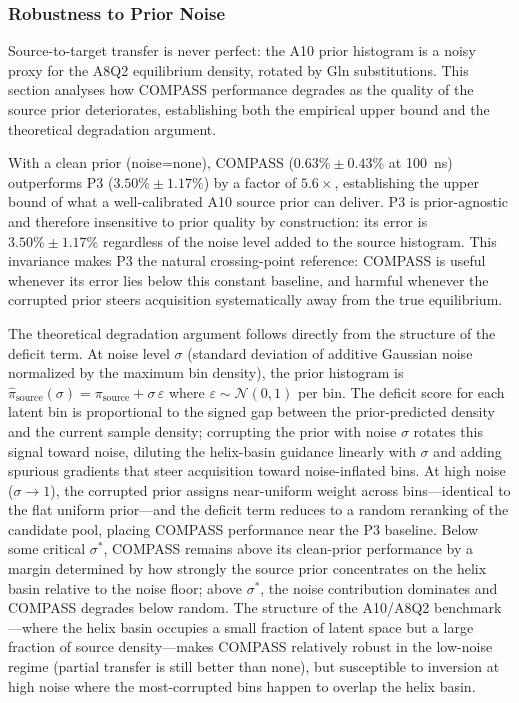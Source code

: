 \subsubsection{Robustness to Prior Noise}
\label{sec:prior_quality}

Source-to-target transfer is never perfect: the A10 prior histogram is a noisy proxy for the A8Q2 equilibrium density, rotated by Gln substitutions.
This section analyses how COMPASS performance degrades as the quality of the source prior deteriorates, establishing both the empirical upper bound and the theoretical degradation argument.

With a clean prior (noise=none), COMPASS ($0.63\%\pm0.43\%$ at 100~ns) outperforms P3 ($3.50\%\pm1.17\%$) by a factor of $5.6\times$, establishing the upper bound of what a well-calibrated A10 source prior can deliver.
P3 is prior-agnostic and therefore insensitive to prior quality by construction: its error is $3.50\%\pm1.17\%$ regardless of the noise level added to the source histogram.
This invariance makes P3 the natural crossing-point reference: COMPASS is useful whenever its error lies below this constant baseline, and harmful whenever the corrupted prior steers acquisition systematically away from the true equilibrium.

The theoretical degradation argument follows directly from the structure of the deficit term.
At noise level $\sigma$ (standard deviation of additive Gaussian noise normalized by the maximum bin density), the prior histogram is $\hat{\pi}_\mathrm{source}(\sigma) = \pi_\mathrm{source} + \sigma\,\varepsilon$ where $\varepsilon\sim\mathcal{N}(0,1)$ per bin.
The deficit score for each latent bin is proportional to the signed gap between the prior-predicted density and the current sample density; corrupting the prior with noise $\sigma$ rotates this signal toward noise, diluting the helix-basin guidance linearly with $\sigma$ and adding spurious gradients that steer acquisition toward noise-inflated bins.
At high noise ($\sigma\to1$), the corrupted prior assigns near-uniform weight across bins---identical to the flat uniform prior---and the deficit term reduces to a random reranking of the candidate pool, placing COMPASS performance near the P3 baseline.
Below some critical $\sigma^*$, COMPASS remains above its clean-prior performance by a margin determined by how strongly the source prior concentrates on the helix basin relative to the noise floor; above $\sigma^*$, the noise contribution dominates and COMPASS degrades below random.
The structure of the A10/A8Q2 benchmark---where the helix basin occupies a small fraction of latent space but a large fraction of source density---makes COMPASS relatively robust in the low-noise regime (partial transfer is still better than none), but susceptible to inversion at high noise where the most-corrupted bins happen to overlap the helix basin.

